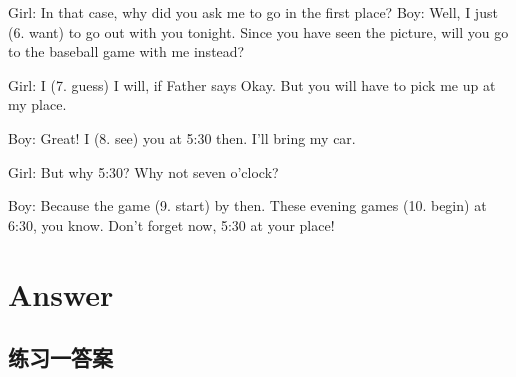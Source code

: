Girl: In that case, why did you ask me to go in the first place? Boy: Well,
I just \ttu (6. want) to go out with you tonight. Since you have seen the
picture, will you go to the baseball game with me instead?

Girl: I \ttu (7. guess) I will, if Father says Okay. But you will have to
pick me up at my place.

Boy: Great! I \ttu (8. see) you at 5:30 then. I'll bring my car.

Girl: But why 5:30? Why not seven o'clock?

Boy: Because the game \ttu (9. start) by then. These evening games \ttu (10.
begin) at 6:30, you know. Don't forget now, 5:30 at your place!

\section{Answer}

\subsection{练习一答案}

